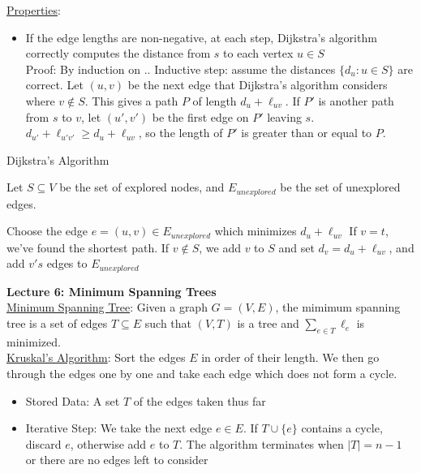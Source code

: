 \documentclass{article}
\begin{document}
\underline{Properties}: 
\begin{itemize}
    \item If the edge lengths are non-negative, at each step, Dijkstra's algorithm correctly computes the distance from $s$ to each vertex $u \in S$ \\
    Proof: By induction on .. Inductive step: assume the distances $\{d_u : u \in S\}$ are correct. Let $(u, v)$ be the next edge that Dijkstra's algorithm considers where $v \notin S$. This gives a path $P$ of length $d_u + \ell_{uv}$. If $P'$ is another path from $s$ to $v$, let $(u', v')$ be the first edge on $P'$ leaving $s$. $d_{u'} + \ell_{u'v'} \geq d_u + \ell_{uv}$, so the length of $P'$ is greater than or equal to $P$.
\end{itemize}

\begin{algorithm}
\caption{Dijkstra's Algorithm}\label{alg:cap}
\begin{algorithmic}
\State Let $S \subseteq V$ be the set of explored nodes, and $E_{unexplored}$ be the set of unexplored edges. 

    \State Choose the edge $e = (u, v) \in E_{unexplored}$ which minimizes $d_u + \ell_{uv}$ 
    \State If $v = t$, we've found the shortest path. 
    \State If $v \notin S$, we add $v$ to $S$ and set $d_v = d_u + \ell_{uv}$, and add $v's$ edges to $E_{unexplored}$
\EndWhile
\end{algorithmic}
\end{algorithm}

\textbf{Lecture 6: Minimum Spanning Trees} \\[1.0ex]
\underline{Minimum Spanning Tree}: Given a graph $G = (V, E)$, the mimimum spanning tree is a set of edges $T \subseteq E$ such that $(V, T)$ is a tree and $\sum_{e \in T} \ell_e$ is minimized.\\[1.0ex]
\underline{Kruskal's Algorithm}: Sort the edges $E$ in order of their length. We then go through the edges one by one and take each edge which does not form a cycle.
\begin{itemize}
    \item Stored Data: A set $T$ of the edges taken thus far 
    \item Iterative Step: We take the next edge $e \in E$. If $T \cup \{e\}$ contains a cycle, discard $e$, otherwise add $e$ to $T$. The algorithm terminates when $|T| = n - 1$ or there are no edges left to consider
\end{itemize}
\end{document}
